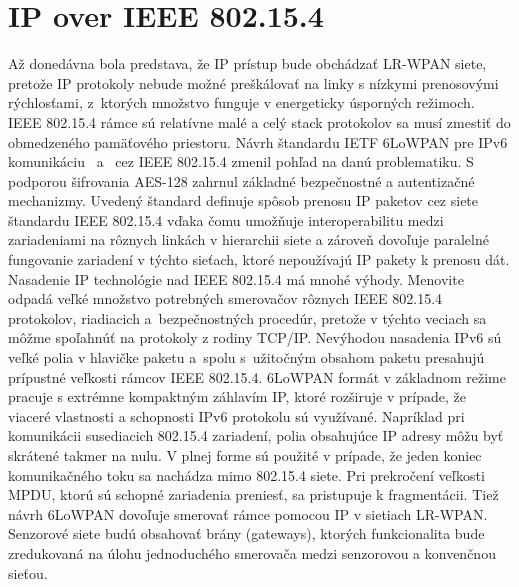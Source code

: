 \section{IP over IEEE 802.15.4}
\indent\indent Až donedávna bola predstava, že IP prístup bude obchádzať LR-WPAN siete, pretože IP protokoly nebude možné preškálovať na linky s nízkymi prenosovými rýchlosťami, z~ktorých množstvo funguje v energeticky úsporných režimoch. IEEE 802.15.4 rámce sú relatívne malé a celý stack protokolov sa musí zmestiť do obmedzeného pamäťového priestoru. Návrh štandardu IETF 6LoWPAN pre IPv6 komunikáciu~\cite{rfc_4919} a~\cite{rfc_4944} cez IEEE 802.15.4 zmenil pohľad na danú problematiku. S podporou šifrovania AES-128 zahrnul základné bezpečnostné a autentizačné mechanizmy. Uvedený štandard definuje spôsob prenosu IP paketov cez siete štandardu IEEE 802.15.4 vďaka čomu umožňuje interoperabilitu medzi zariadeniami na rôznych linkách v hierarchii siete a zároveň dovoľuje paralelné fungovanie zariadení v týchto sieťach, ktoré nepoužívajú IP pakety k prenosu dát.\\
\indent Nasadenie IP technológie nad IEEE 802.15.4 má mnohé výhody. Menovite odpadá veľké množstvo potrebných smerovačov rôznych IEEE 802.15.4 protokolov, riadiacich a~bezpečnostných procedúr, pretože v týchto veciach sa môžme spoľahnúť na protokoly z rodiny TCP/IP. Nevýhodou nasadenia IPv6 sú veľké polia v hlavičke paketu a~spolu s~užitočným obsahom paketu presahujú prípustné veľkosti rámcov IEEE 802.15.4. 6LoWPAN formát v základnom režime pracuje s extrémne kompaktným záhlavím IP, ktoré rozširuje v prípade, že viaceré vlastnosti a schopnosti IPv6 protokolu sú využívané. Napríklad pri komunikácii susediacich 802.15.4 zariadení, polia obsahujúce IP adresy môžu byť skrátené takmer na nulu. V plnej forme sú použité v prípade, že jeden koniec komunikačného toku sa nachádza mimo 802.15.4 siete. Pri prekročení veľkosti MPDU, ktorú sú schopné zariadenia preniesť, sa pristupuje k fragmentácii. Tiež návrh 6LoWPAN dovoľuje smerovať rámce pomocou IP v sietiach LR-WPAN. Senzorové siete budú obsahovať brány (gateways), ktorých funkcionalita bude zredukovaná na úlohu jednoduchého smerovača medzi senzorovou a konvenčnou sieťou.\\
